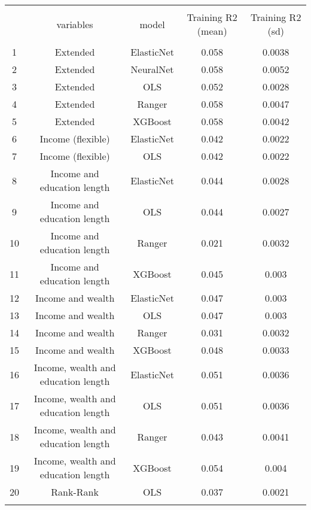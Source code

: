 
\begin{tabular}{@{\extracolsep{5pt}} ccccc} 
\\[-1.8ex]\hline 
\hline \\[-1.8ex] 
 & variables & model & Training R2 (mean) & Training R2 (sd) \\ 
\hline \\[-1.8ex] 
1 & Extended & ElasticNet & 0.058 & 0.0038 \\ 
2 & Extended & NeuralNet & 0.058 & 0.0052 \\ 
3 & Extended & OLS & 0.052 & 0.0028 \\ 
4 & Extended & Ranger & 0.058 & 0.0047 \\ 
5 & Extended & XGBoost & 0.058 & 0.0042 \\ 
6 & Income (flexible) & ElasticNet & 0.042 & 0.0022 \\ 
7 & Income (flexible) & OLS & 0.042 & 0.0022 \\ 
8 & Income and education length & ElasticNet & 0.044 & 0.0028 \\ 
9 & Income and education length & OLS & 0.044 & 0.0027 \\ 
10 & Income and education length & Ranger & 0.021 & 0.0032 \\ 
11 & Income and education length & XGBoost & 0.045 & 0.003 \\ 
12 & Income and wealth & ElasticNet & 0.047 & 0.003 \\ 
13 & Income and wealth & OLS & 0.047 & 0.003 \\ 
14 & Income and wealth & Ranger & 0.031 & 0.0032 \\ 
15 & Income and wealth & XGBoost & 0.048 & 0.0033 \\ 
16 & Income, wealth and education length & ElasticNet & 0.051 & 0.0036 \\ 
17 & Income, wealth and education length & OLS & 0.051 & 0.0036 \\ 
18 & Income, wealth and education length & Ranger & 0.043 & 0.0041 \\ 
19 & Income, wealth and education length & XGBoost & 0.054 & 0.004 \\ 
20 & Rank-Rank & OLS & 0.037 & 0.0021 \\ 
\hline \\[-1.8ex] 
\end{tabular} 

